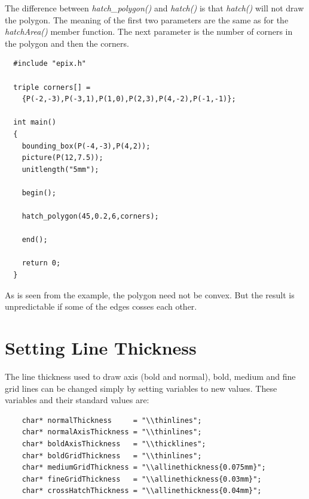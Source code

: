 \documentclass[12pt,a4paper]{article}
\begin{document}
  The difference between \textit{hatch\_polygon()} and
  \textit{hatch()} is that \textit{hatch()} will not draw the
  polygon. The meaning of the first two parameters are the same as for
  the \textit{hatchArea()} member function. The next parameter is the
  number of corners in the polygon and then the corners.

  \begin{minipage}{7.5cm}
    \begin{lstlisting}
  #include "epix.h"

  triple corners[] =
    {P(-2,-3),P(-3,1),P(1,0),P(2,3),P(4,-2),P(-1,-1)};

  int main()
  {
    bounding_box(P(-4,-3),P(4,2));
    picture(P(12,7.5));
    unitlength("5mm");

    begin();

    hatch_polygon(45,0.2,6,corners);

    end();

    return 0;
  }
    \end{lstlisting}
  \end{minipage}
  \begin{minipage}{5.5cm}
    \vspace{1.5cm}
    
  \end{minipage}

  As is seen from the example, the polygon need not be convex. But the
  result is unpredictable if some of the edges cosses each other.

  \section{Setting Line Thickness}

  The line thickness used to draw axis (bold and normal), bold, medium
  and fine grid lines can be changed simply by setting variables to
  new values.  These variables and their standard values are:

  \begin{lstlisting}
    char* normalThickness     = "\\thinlines";
    char* normalAxisThickness = "\\thinlines";
    char* boldAxisThickness   = "\\thicklines";
    char* boldGridThickness   = "\\thinlines";
    char* mediumGridThickness = "\\allinethickness{0.075mm}";
    char* fineGridThickness   = "\\allinethickness{0.03mm}";
    char* crossHatchThickness = "\\allinethickness{0.04mm}";
  \end{lstlisting}
\end{document}
